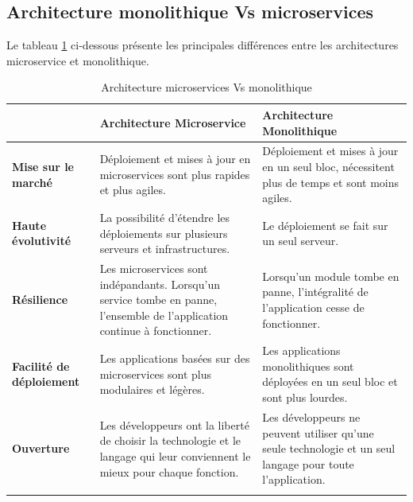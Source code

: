 \subsection{Architecture monolithique Vs microservices}

Le tableau \ref{tab:comp} ci-dessous présente les principales différences entre les architectures microservice et monolithique.
\begin{longtable}[c]{
    |p{}|
    |p{}|
    |p{}|
}
    \hline
    &    \textbf{Architecture Microservice}
    &    \textbf{Architecture Monolithique}\\
    \hline
    \textbf{Mise sur le marché}
    & Déploiement et mises à jour en microservices sont plus rapides et plus agiles.
    &Déploiement et mises à jour en un seul bloc, nécessitent plus de temps et sont moins agiles.    \\
    \hline
     \textbf{Haute évolutivité}
    & La possibilité d'étendre les déploiements sur plusieurs serveurs et infrastructures.
    &Le déploiement se fait sur un seul serveur.\\
    \hline
     \textbf{Résilience}
    & Les microservices sont indépandants. Lorsqu'un service tombe en panne, l'ensemble de l'application continue à fonctionner.
    & Lorsqu'un module tombe en panne, l'intégralité de l'application cesse de fonctionner.\\
    \hline
    \textbf{Facilité de déploiement}
    & Les applications basées sur des microservices sont plus modulaires et légères.
    &Les applications monolithiques sont déployées en un seul bloc et sont plus lourdes.\\
    \hline
    \textbf{Ouverture}
    & Les développeurs ont la liberté de choisir la technologie et le langage qui leur conviennent le mieux pour chaque fonction.
    &Les développeurs ne peuvent utiliser qu'une seule technologie et un seul langage pour toute l'application.\\
    \hline
\caption{Architecture microservices Vs monolithique}
\label{tab:comp}
\end{longtable} 

